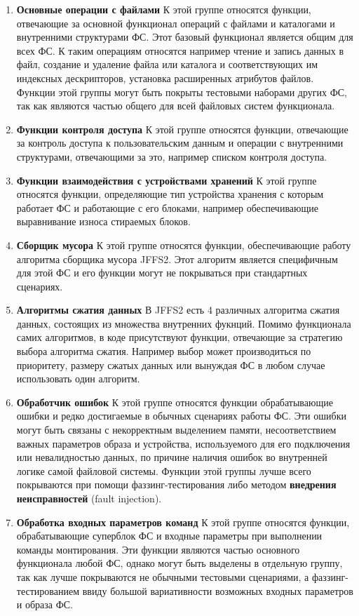 \begin{enumerate}
	\item \textbf{Основные операции с файлами}
	К этой группе относятся функции, отвечающие за основной функционал операций с файлами и каталогами и внутренними структурами  ФС. Этот базовый функционал является общим для всех ФС. К таким операциям относятся например чтение и запись данных в файл, создание и удаление файла или каталога и соответствующих им индексных дескрипторов, установка расширенных атрибутов файлов. Функции этой группы могут быть покрыты тестовыми наборами других ФС, так как являются частью общего для всей файловых систем функционала.
	\item \textbf{Функции контроля доступа}
	К этой группе относятся функции, отвечающие за контроль доступа к пользовательским данным и операции с внутренними структурами, отвечающими за это, например списком контроля доступа.
	\item \textbf{Функции взаимодействия с устройствами хранений}
	К этой группе относятся функции, определяющие тип устройства хранения с которым работает ФС и работающие с его блоками, например обеспечивающие выравнивание износа стираемых блоков.
	\item \textbf{Сборщик мусора}
	К этой группе относятся функции, обеспечивающие работу алгоритма сборщика мусора JFFS2. Этот алгоритм является специфичным для этой ФС и его функции могут не покрываться при стандартных сценариях.
	\item \textbf{Алгоритмы сжатия данных}
	В JFFS2 есть 4 различных алгоритма сжатия данных, состоящих из множества внутренних фукнций. Помимо функционала самих алгоритмов, в коде присутствуют функции, отвечающие за стратегию выбора алгоритма сжатия. Например выбор может производиться по приоритету, размеру сжатых данных или вынуждая ФС в любом случае использовать один алгоритм.
	\item \textbf{Обработчик ошибок}
	К этой группе относятся функции обрабатывающие ошибки и редко достигаемые в обычных сценариях работы ФС. Эти ошибки могут быть связаны с некорректным выделением памяти, несоответствием важных параметров образа и устройства, используемого для его подключения или невалидностью данных, по причине наличия ошибок во внутренней логике самой файловой системы. Функции этой группы лучше всего покрываются при помощи фаззинг-тестирования либо методом \textbf{внедрения неисправностей} (fault injection). 
	\item \textbf{Обработка входных параметров команд}
	К этой группе относятся функции, обрабатывающие суперблок ФС и входные параметры при выполнении команды монтирования. Эти функции являются частью основного функционала любой ФС, однако могут быть выделены в отдельную группу, так как лучше покрываются не обычными тестовыми сценариями, а фаззинг-тестированием ввиду большой вариативности возможных входных параметров и образа ФС.

\end{enumerate}
